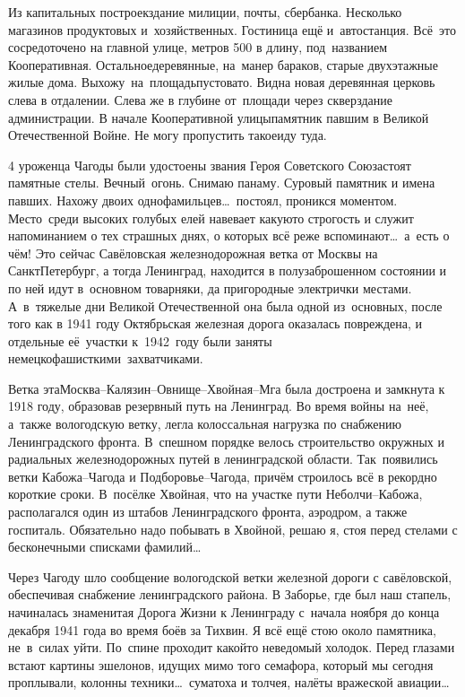 Из капитальных построек\mdash здание милиции, почты, сбербанка. Несколько магазинов продуктовых и~хозяйственных. Гостиница ещё и~автостанция. Всё~это сосредоточено на главной улице, метров 500 в длину, под~названием Кооперативная. Остальное\mdash деревянные, на~манер бараков, старые двухэтажные жилые дома. Выхожу~на~площадь\mdash пустовато. Видна новая деревянная церковь слева в отдалении. Слева же в глубине от~площади через сквер\mdash здание администрации. В начале Кооперативной улицы\mdash памятник павшим в Великой Отечественной Войне. Не могу пропустить такое\mdash иду туда. 

4 уроженца Чагоды были удостоены звания Героя Советского Союза\mdash стоят памятные стелы. Вечный~огонь. Снимаю панаму. Суровый памятник и имена павших. Нахожу двоих однофамильцев\ldots~постоял, проникся моментом. Место~среди высоких голубых елей навевает какую\sdash то строгость и служит напоминанием о тех страшных днях, о которых всё реже вспоминают\ldots~а~есть о чём! Это сейчас Савёловская железнодорожная ветка от Москвы на Санкт\sdash Петербург, а тогда Ленинград, находится в полузаброшенном состоянии и по ней идут в~основном товарняки, да пригородные электрички местами. А~в~тяжелые дни Великой Отечественной она была одной из~основных, после того как в 1941 году Октябрьская железная дорога оказалась повреждена, и отдельные её~участки к~1942~году были заняты немецко\sdash фашисткими~захватчиками.

Ветка эта\mdash Москва\nobreakdash--Калязин\nobreakdash--Овнище\nobreakdash--Хвойная\nobreakdash--Мга была достроена и замкнута к 1918 году, образовав резервный путь на Ленинград. Во время войны на~неё, а~также вологодскую ветку, легла колоссальная нагрузка по снабжению Ленинградского фронта. В~спешном порядке велось строительство окружных и радиальных железнодорожных путей в ленинградской области. Так~появились ветки Кабожа\nobreakdash--Чагода и Подборовье\nobreakdash--Чагода, причём строилось всё в рекордно короткие сроки. В~посёлке Хвойная, что на участке пути Неболчи\nobreakdash--Кабожа, располагался один из штабов Ленинградского фронта, аэродром, а также госпиталь. Обязательно надо побывать в Хвойной, решаю я, стоя перед стелами с бесконечными списками фамилий…

Через Чагоду шло сообщение вологодской ветки железной дороги с савёловской, обеспечивая снабжение ленинградского района. В Заборье, где был наш стапель, начиналась знаменитая Дорога Жизни к Ленинграду с~начала ноября до конца декабря 1941 года во время боёв за Тихвин. Я всё ещё стою около памятника, не~в~силах уйти. По~спине проходит какой\sdash то неведомый холодок. Перед глазами встают картины эшелонов, идущих мимо того семафора, который мы сегодня проплывали, колонны техники\ldots~суматоха и толчея, налёты вражеской авиации\ldots~  

